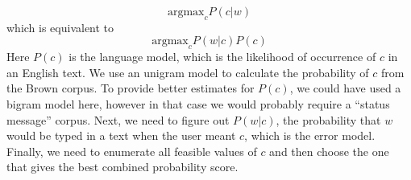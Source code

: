 \begin{itemize}
\begin{equation*}
 \mbox{argmax}_c P(c|w)
\end{equation*}
which is equivalent to 
\begin{equation*}
\mbox{argmax}_c P(w|c) P(c)
\end{equation*}
Here $P(c)$ is the language model, which is the likelihood of occurrence of $c$ in an English text. We use an unigram model to calculate the probability of $c$ from the Brown corpus. To provide better estimates for $P(c)$, we could have used a bigram model here, however in that case we would probably require a ``status message'' corpus. Next, we need to figure out $P(w|c)$, the probability that $w$ would be typed in a text when the user meant $c$, which is the error model. Finally, we need to enumerate all feasible values of $c$ and then choose the one that gives the best combined probability score. 


\end{itemize}














